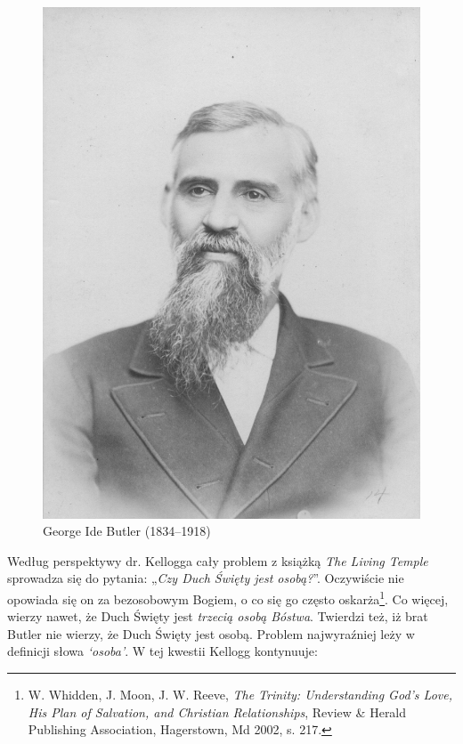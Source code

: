 \begin{figure}[hp]
    \centering
    \includegraphics[width=1\linewidth]{images/george-ide-butler.jpg}
    \caption*{George Ide Butler (1834--1918)}
    \label{fig:g-i-butler}
\end{figure}

Według perspektywy dr. Kellogga cały problem z książką \textit{The Living Temple} sprowadza się do pytania: „\textit{Czy Duch Święty jest osobą?}”. Oczywiście nie opowiada się on za bezosobowym Bogiem, o co się go często oskarża\footnote{W. Whidden, J. Moon, J. W. Reeve, \textit{The Trinity: Understanding God's Love, His Plan of Salvation, and Christian Relationships}, Review \& Herald Publishing Association, Hagerstown, Md 2002, s. 217.}. Co więcej, wierzy nawet, że Duch Święty jest \textit{trzecią osobą Bóstwa}. Twierdzi też, iż brat Butler nie wierzy, że Duch Święty jest osobą. Problem najwyraźniej leży w definicji słowa \textit{‘osoba’}. W tej kwestii Kellogg kontynuuje:

